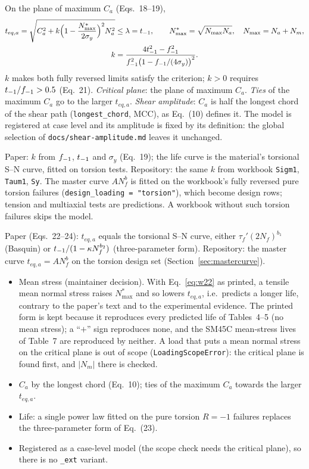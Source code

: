  On the plane of maximum $C_a$ (Eqs.~18--19),
\begin{gather}
t_{eq,a} = \sqrt{C_a^2 + k\Bigl(1-\frac{N^*_{\max}}{2\sigma_y}\Bigr)^2 N_a^2} \le \lambda = t_{-1} ,
\qquad N^*_{\max}=\sqrt{N_{\max}N_a},\quad N_{\max}=N_a+N_m , \label{eq:w22}\\
k = \frac{4t_{-1}^2-f_{-1}^2}{f_{-1}^2\bigl(1-f_{-1}/(4\sigma_y)\bigr)^2} . \label{eq:w22-k}
\end{gather}
$k$ makes both fully reversed limits satisfy the criterion; $k>0$ requires $t_{-1}/f_{-1}>0.5$ (Eq.~21).
\emph{Critical plane}: the plane of maximum $C_a$. \emph{Ties} of the maximum $C_a$ go to the larger
$t_{eq,a}$. \emph{Shear amplitude}: $C_a$ is half the longest chord of the shear path
(\texttt{longest\_chord}, MCC), as Eq.~(10) defines it. The model is registered at case level and its
amplitude is fixed by its definition: the global selection of \texttt{docs/shear-amplitude.md} leaves
it unchanged.

 Paper: $k$ from $f_{-1}$, $t_{-1}$ and $\sigma_y$ (Eq.~19); the life
curve is the material's torsional S--N curve, fitted on torsion tests. Repository: the same $k$ from
workbook \texttt{Sigm1}, \texttt{Taum1}, \texttt{Sy}. The master curve $AN_f^b$ is fitted on the
workbook's fully reversed pure torsion failures (\texttt{design\_loading = "torsion"}), which become
design rows; tension and multiaxial tests are predictions. A workbook without such torsion failures
skips the model.

 Paper (Eqs.~22--24): $t_{eq,a}$ equals the torsional S--N curve, either
$\tau_f'(2N_f)^{b_1}$ (Basquin) or $t_{-1}/(1-\kappa N_f^{b_2})$ (three-parameter form). Repository: the
master curve $t_{eq,a}=AN_f^b$ on the torsion design set (Section~\ref{sec:mastercurve}).

\begin{itemize}
\item Mean stress (maintainer decision). With Eq.~\eqref{eq:w22} as printed, a tensile mean normal
  stress raises $N^*_{\max}$ and so lowers $t_{eq,a}$, i.e.\ predicts a longer life, contrary to the
  paper's text and to the experimental evidence. The printed form is kept because it reproduces every
  predicted life of Tables~4--5 (no mean stress); a ``$+$'' sign reproduces none, and the SM45C
  mean-stress lives of Table~7 are reproduced by neither. A load that puts a mean normal stress on the
  critical plane is out of scope (\texttt{LoadingScopeError}): the critical plane is found first, and
  $|N_m|$ there is checked.
\item $C_a$ by the longest chord (Eq.~10); ties of the maximum $C_a$ towards the larger $t_{eq,a}$.
\item Life: a single power law fitted on the pure torsion $R=-1$ failures replaces the
  three-parameter form of Eq.~(23).
\item Registered as a case-level model (the scope check needs the critical plane), so there is no
  \texttt{\_ext} variant.
\end{itemize}

